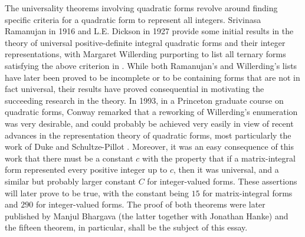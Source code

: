 The universality theorems involving quadratic forms revolve around finding
specific criteria for a quadratic form to represent all integers. Srivinasa
Ramanujan in 1916 \cite{ramanujan1916onthe} and L.E. Dickson in 1927 provide
some initial results in the theory of universal positive-definite integral
quadratic forms and their integer representations, with Margaret Willerding
purporting to list all ternary forms satisfying the above criterion in
\cite{willerding1948determination}. While both Ramanujan's and Willerding's
lists have later been proved to be incomplete or to be containing forms that are
not in fact universal, their results have proved consequential in motivating the
succeeding research in the theory. In 1993, in a Princeton graduate course on
quadratic forms, Conway remarked that a reworking of Willerding's enumeration
was very desirable, and could probably be achieved very easily in view of recent
advances in the representation theory of quadratic forms, most particularly the
work of Duke and Schultze-Pillot \cite{schulze1991algorithm}. Moreover, it was
an easy consequence of this work that there must be a constant \(c\) with the
property that if a matrix-integral form represented every positive integer up to
\(c\), then it was universal, and a similar but probably larger constant \(C\)
for integer-valued forms. \cite{conway1999universal} These assertions will later
prove to be true, with the constant being \(15\) for matrix-integral forms and
\(290\) for integer-valued forms. The proof of both theorems were later
published by Manjul Bhargava (the latter together with Jonathan Hanke) and the
fifteen theorem, in particular, shall be the subject of this essay.